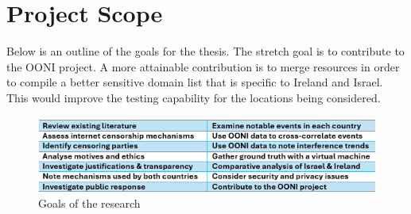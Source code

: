 \section{Project Scope}
Below is an outline of the goals for the thesis. The stretch goal is to contribute to the OONI project. A more attainable contribution is to merge resources in order to compile a better sensitive domain list that is specific to Ireland and Israel. This would improve the testing capability for the locations being considered.

\begin{figure}
    \centering
    \includegraphics[width=1\linewidth]{introduction/thesisgoals.png}
    \caption{Goals of the research}
    \label{fig:enter-label}
\end{figure}
